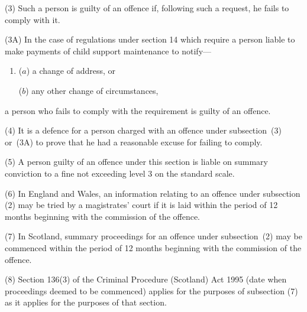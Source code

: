 \documentclass[12pt,a4paper]{article}
\begin{document}
(3) Such a person is guilty of an offence if, following such a request, he fails to comply with it.


(3A) In the case of regulations under section 14 which require a person liable to make payments of child support maintenance to notify—
\begin{enumerate}\item[]
($a$) a change of address, or

($b$) any other change of circumstances,
\end{enumerate}
a person who fails to comply with the requirement is guilty of an offence.

(4) It is a defence for a person charged with an offence under subsection~(3)  
or~(3A)  %
to prove that he had a reasonable excuse for failing to comply.

(5) A person guilty of an offence under this section is liable on summary conviction to a fine not exceeding level 3 on the standard scale.

(6) In England and Wales, an information relating to an offence under subsection (2) may be tried by a magistrates' court if it is laid within the period of 12 months beginning with the commission of the offence.

(7) In Scotland, summary proceedings for an offence under subsection~(2) may be commenced within the period of 12 months beginning with the commission of the offence.

(8) Section 136(3) of the Criminal Procedure (Scotland) Act 1995 (date when proceedings deemed to be commenced) applies for the purposes of subsection (7) as it applies for the purposes of that section.

\end{document}

